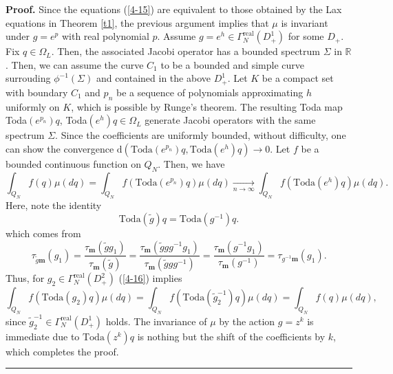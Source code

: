 \documentclass[a4paper]{article}%
\newenvironment{proof}[1][Proof]{\noindent\textbf{#1.} }{\ \rule{0.5em}{0.5em}}
\begin{document}
\begin{proof}
Since the equations (\ref{4-15}) are equivalent to those obtained by the Lax
equations in Theorem \ref{t1}, the previous argument implies that $\mu$ is
invariant under $g=e^{p}$ with real polynomial $p$. Assume $g=e^{h}\in
\Gamma_{N}^{\operatorname{real}}\left(  D_{+}^{1}\right)  $ for some $D_{+}$.
Fix $q\in\Omega_{L}$. Then, the associated Jacobi operator has a bounded
spectrum $\Sigma$ in $\mathbb{R}$. Then, we can assume the curve $C_{1}$ to be
a bounded and simple curve surrouding $\phi^{-1}\left(  \Sigma\right)  $ and
contained in the above $D_{+}^{1}$. Let $K$ be a compact set with boundary
$C_{1}$ and $p_{n}$ be a sequence of polynomials approximating $h$ uniformly
on $K$, which is possible by Runge's theorem. The resulting Toda map
\textrm{Toda}$\left(  e^{p_{n}}\right)  q$, \textrm{Toda}$\left(
e^{h}\right)  q\in\Omega_{L}$ generate Jacobi operators with the same spectrum
$\Sigma$. Since the coefficients are uniformly bounded, without difficulty,
one can show the convergence $\mathrm{d}\left(  \mathrm{Toda}\left(  e^{p_{n}%
}\right)  q,\mathrm{Toda}\left(  e^{h}\right)  q\right)  \rightarrow0$. Let
$f$ be a bounded continuous function on $Q_{N}$. Then, we have \
\[
\int_{Q_{N}}f\left(  q\right)  \mu\left(  dq\right)  =\int_{Q_{N}}f\left(
\mathrm{Toda}\left(  e^{p_{n}}\right)  q\right)  \mu\left(  dq\right)
\underset{n\rightarrow\infty}{\rightarrow}\int_{Q_{N}}f\left(  \mathrm{Toda}%
\left(  e^{h}\right)  q\right)  \mu\left(  dq\right)  \text{.}%
\]
Here, note the identity%
\begin{equation}
\mathrm{Toda}\left(  \widetilde{g}\right)  q=\mathrm{Toda}\left(
g^{-1}\right)  q\text{.} \label{4-16}%
\end{equation}
which comes from%
\[
\tau_{\widetilde{g}\boldsymbol{m}}\left(  g_{1}\right)  =\dfrac{\tau
_{\boldsymbol{m}}\left(  \widetilde{g}g_{1}\right)  }{\tau_{\boldsymbol{m}%
}\left(  \widetilde{g}\right)  }=\dfrac{\tau_{\boldsymbol{m}}\left(
\widetilde{g}gg^{-1}g_{1}\right)  }{\tau_{\boldsymbol{m}}\left(  \widetilde
{g}gg^{-1}\right)  }=\dfrac{\tau_{\boldsymbol{m}}\left(  g^{-1}g_{1}\right)
}{\tau_{\boldsymbol{m}}\left(  g^{-1}\right)  }=\tau_{g^{-1}\boldsymbol{m}%
}\left(  g_{1}\right)  \text{.}%
\]
Thus, for $g_{2}\in\Gamma_{N}^{\operatorname{real}}\left(  D_{+}^{2}\right)  $
(\ref{4-16}) implies%
\[
\int_{Q_{N}}f\left(  \mathrm{Toda}\left(  g_{2}\right)  q\right)  \mu\left(
dq\right)  =\int_{Q_{N}}f\left(  \mathrm{Toda}\left(  \widetilde{g}_{2}%
^{-1}\right)  q\right)  \mu\left(  dq\right)  =\int_{Q_{N}}f\left(  q\right)
\mu\left(  dq\right)  \text{,}%
\]
since $\widetilde{g}_{2}^{-1}\in\Gamma_{N}^{\operatorname{real}}\left(
D_{+}^{1}\right)  $ holds. The invariance of $\mu$ by the action $g=z^{k}$ is
immediate due to $\mathrm{Toda}\left(  z^{k}\right)  q$ is nothing but the
shift of the coefficients by $k$, which completes the proof.\bigskip
\end{proof}
\end{document}

